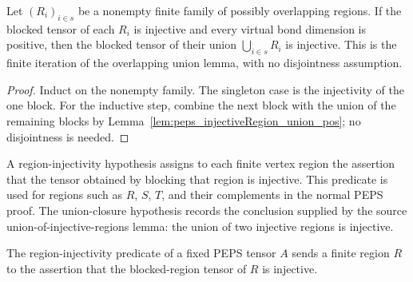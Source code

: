\begin{lemma}%
    \label{lem:peps_injectiveRegion_biUnion}
    \leanok
    Let $(R_i)_{i\in s}$ be a nonempty finite family of possibly overlapping
    regions. If the blocked tensor of each $R_i$ is injective and every virtual
    bond dimension is positive, then the blocked tensor of their union
    $\bigcup_{i\in s} R_i$ is injective. This is the finite iteration of the
    overlapping union lemma, with no disjointness assumption.
\end{lemma}
\begin{proof}\leanok
    Induct on the nonempty family. The singleton case is the injectivity of the
    one block. For the inductive step, combine the next block with the union of
    the remaining blocks by Lemma~\ref{lem:peps_injectiveRegion_union_pos}; no
    disjointness is needed.
\end{proof}

\begin{definition}%
    \label{def:peps_regionInjectivityData}
    \leanok
    A region-injectivity hypothesis assigns to each finite vertex region the
    assertion that the tensor obtained by blocking that region is injective.
    This predicate is used for regions such as $R$, $S$, $T$, and their
    complements in the normal PEPS proof. The union-closure hypothesis records
    the conclusion supplied by the source union-of-injective-regions lemma:
    the union of two injective regions is injective.
\end{definition}

\begin{definition}%
    \label{def:peps_regionInjectivityDataOf}
    \leanok
    The region-injectivity predicate of a fixed PEPS tensor $A$ sends a finite
    region $R$ to the assertion that the blocked-region tensor of $R$ is
    injective.
\end{definition}


